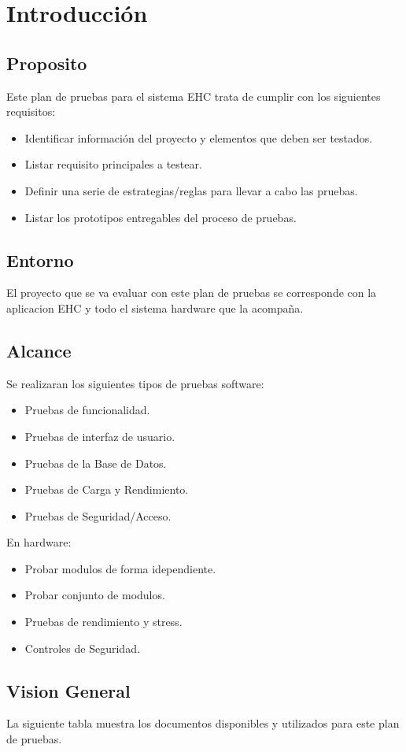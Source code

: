 \section{Introducción}
\subsection{Proposito}
	Este plan de pruebas para el sistema EHC trata de cumplir con los siguientes requisitos:
	\begin{itemize}
	\item Identificar información del proyecto y elementos que deben ser testados.
	\item Listar requisito principales a testear.
	\item Definir una serie de estrategias/reglas para llevar a cabo las pruebas.
	\item Listar los prototipos entregables del proceso de pruebas.
	\end{itemize}
\subsection{Entorno}
	El proyecto que se va evaluar con este plan de pruebas se corresponde con la aplicacion EHC y todo el sistema hardware que la acompaña.
\subsection{Alcance}
	Se realizaran los siguientes tipos de pruebas software:
	\begin{itemize}
	\item Pruebas de funcionalidad.
	\item Pruebas de interfaz de usuario.
	\item Pruebas de la Base de Datos.
	\item Pruebas de Carga y Rendimiento.
	\item Pruebas de Seguridad/Acceso.
	\end{itemize}
	En hardware:
	\begin{itemize}
	\item Probar modulos de forma idependiente.
	\item Probar conjunto de modulos.
	\item Pruebas de rendimiento y stress.
	\item Controles de Seguridad.
	\end{itemize}
\subsection{Vision General}
La siguiente tabla muestra los documentos disponibles y utilizados para este plan de pruebas.

